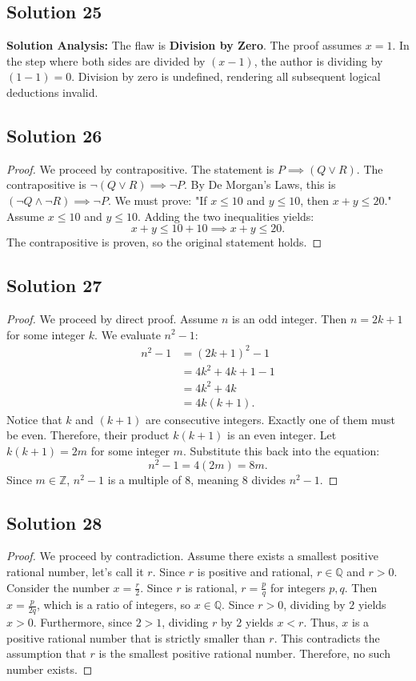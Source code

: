 \documentclass[11pt]{article}
\begin{document}
\subsection{Solution 25}
\textbf{Solution Analysis:} The flaw is \textbf{Division by Zero}. The proof assumes $x = 1$. In the step where both sides are divided by $(x-1)$, the author is dividing by $(1-1) = 0$. Division by zero is undefined, rendering all subsequent logical deductions invalid.

\subsection{Solution 26}
\begin{proof}
We proceed by contrapositive. The statement is $P \implies (Q \lor R)$. The contrapositive is $\neg(Q \lor R) \implies \neg P$. By De Morgan's Laws, this is $(\neg Q \land \neg R) \implies \neg P$.
We must prove: "If $x \le 10$ and $y \le 10$, then $x+y \le 20$."
Assume $x \le 10$ and $y \le 10$.
Adding the two inequalities yields:
\[ x + y \le 10 + 10 \implies x + y \le 20. \]
The contrapositive is proven, so the original statement holds.
\end{proof}

\subsection{Solution 27}
\begin{proof}
We proceed by direct proof. Assume $n$ is an odd integer. Then $n = 2k+1$ for some integer $k$.
We evaluate $n^2 - 1$:
\begin{align*}
n^2 - 1 &= (2k+1)^2 - 1 \\
&= 4k^2 + 4k + 1 - 1 \\
&= 4k^2 + 4k \\
&= 4k(k+1).
\end{align*}
Notice that $k$ and $(k+1)$ are consecutive integers. Exactly one of them must be even. Therefore, their product $k(k+1)$ is an even integer. Let $k(k+1) = 2m$ for some integer $m$.
Substitute this back into the equation:
\[ n^2 - 1 = 4(2m) = 8m. \]
Since $m \in \mathbb{Z}$, $n^2 - 1$ is a multiple of $8$, meaning $8$ divides $n^2 - 1$.
\end{proof}

\subsection{Solution 28}
\begin{proof}
We proceed by contradiction. Assume there exists a smallest positive rational number, let's call it $r$. Since $r$ is positive and rational, $r \in \mathbb{Q}$ and $r > 0$.
Consider the number $x = \frac{r}{2}$. 
Since $r$ is rational, $r = \frac{p}{q}$ for integers $p, q$. Then $x = \frac{p}{2q}$, which is a ratio of integers, so $x \in \mathbb{Q}$.
Since $r > 0$, dividing by $2$ yields $x > 0$.
Furthermore, since $2 > 1$, dividing $r$ by $2$ yields $x < r$.
Thus, $x$ is a positive rational number that is strictly smaller than $r$. This contradicts the assumption that $r$ is the smallest positive rational number. Therefore, no such number exists.
\end{proof}
\end{document}
